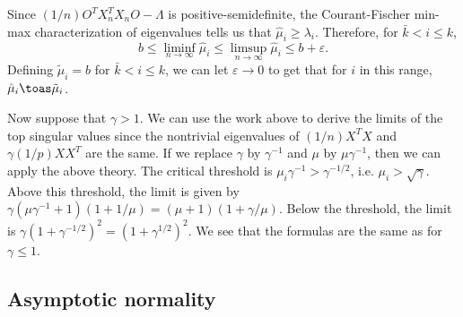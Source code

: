 Since $(1/n) O^T X_n^T X_n O - \Lambda$ is positive-semidefinite, the
Courant-Fischer min-max characterization of eigenvalues tells us that
$\hat \mu_i \geq \lambda_i$. Therefore, for $\bar k < i \leq k$,
\[
    b
    \leq
    \liminf_{n \to \infty} \hat \mu_i
    \leq
    \limsup_{n \to \infty} \hat \mu_i    
    \leq
    b + \varepsilon.
\]
Defining $\tilde \mu_i = b$ for $\bar k < i \leq k$, we can let
$\varepsilon \to 0$ to get that for $i$ in this range,
$\hat \mu_i \toas \tilde \mu_i$.

Now suppose that $\gamma > 1$.  We can use the work above to derive the limits of the top singular values since the nontrivial eigenvalues of $(1/n) X^T X$ and $\gamma (1/p) X X^T$ are the same.  If we replace $\gamma$ by $\gamma^{-1}$ and $\mu$ by $\mu \gamma^{-1}$, then we can apply the above theory.  The critical threshold is $\mu_i \gamma^{-1} > \gamma^{-1/2}$, i.e. $\mu_i > \sqrt{\gamma}$.  Above this threshold, the limit is given by $\gamma ( \mu \gamma^{-1} + 1)(1 + 1/\mu) = (\mu + 1)\left( 1 + \gamma/\mu \right)$.  Below the threshold, the limit is $\gamma (1 + \gamma^{-1/2})^2 = (1 + \gamma^{1/2})^2$.  We see that the formulas are the same as for $\gamma \leq 1$.

\subsection{Asymptotic normality}

